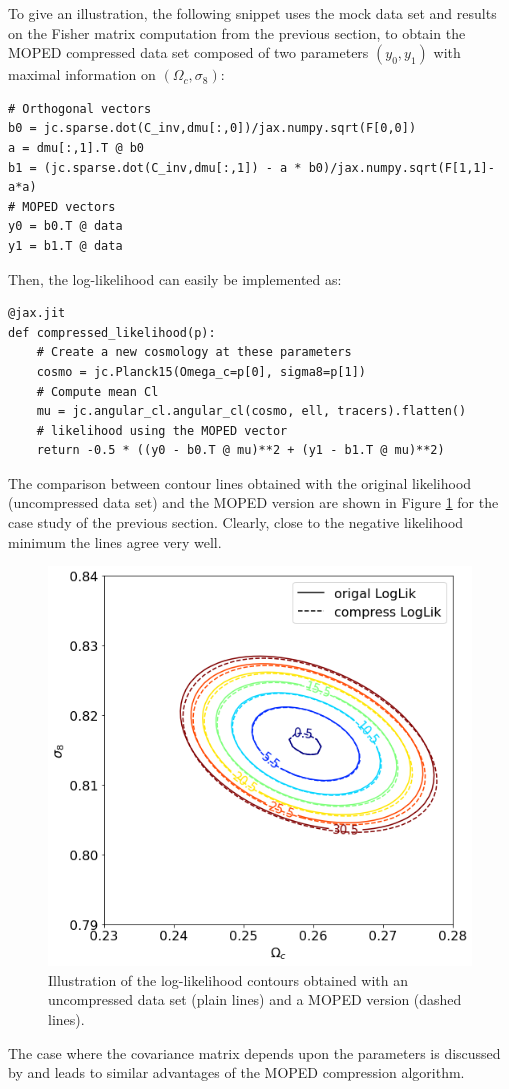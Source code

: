 \documentclass[twocolumn,twocolappendix,nofootinbib,iop]{openjournal}
\begin{document}
To give an illustration, the following snippet uses the mock data set and results on the Fisher matrix computation from the previous section, to obtain the MOPED compressed data set composed of two parameters $(y_0,y_1)$ with maximal information on $(\Omega_c, \sigma_8)$:  
\begin{lstlisting}[language=iPython]
# Orthogonal vectors
b0 = jc.sparse.dot(C_inv,dmu[:,0])/jax.numpy.sqrt(F[0,0])
a = dmu[:,1].T @ b0
b1 = (jc.sparse.dot(C_inv,dmu[:,1]) - a * b0)/jax.numpy.sqrt(F[1,1]-a*a)
# MOPED vectors
y0 = b0.T @ data
y1 = b1.T @ data
\end{lstlisting}
Then, the log-likelihood can easily be implemented as:
\begin{lstlisting}[language=iPython]
@jax.jit
def compressed_likelihood(p):
    # Create a new cosmology at these parameters
    cosmo = jc.Planck15(Omega_c=p[0], sigma8=p[1])
    # Compute mean Cl
    mu = jc.angular_cl.angular_cl(cosmo, ell, tracers).flatten()
    # likelihood using the MOPED vector
    return -0.5 * ((y0 - b0.T @ mu)**2 + (y1 - b1.T @ mu)**2)
\end{lstlisting}
The comparison between contour lines obtained with the original likelihood (uncompressed data set) and the MOPED version are shown in Figure \ref{fig:moped} for the case study of the previous section. Clearly, close to the negative likelihood minimum the lines agree very well.
\begin{figure}
    \centering
    \includegraphics[width=\columnwidth]{figures/moded.png}
    \caption{Illustration of the log-likelihood contours obtained with an uncompressed data set (plain lines) and a MOPED version (dashed lines).} 
    \label{fig:moped}
\end{figure}
%
The case where the covariance matrix depends upon the parameters is discussed by  \citet{2017MNRAS.472.4244H} and leads to similar advantages of the MOPED compression algorithm.
\end{document}
